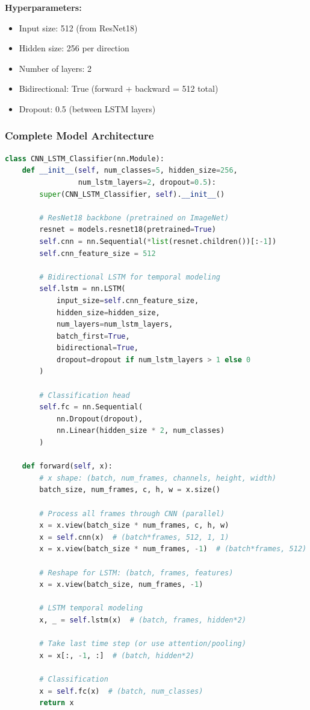 \documentclass[11pt,a4paper]{article}
\begin{document}
\textbf{Hyperparameters:}
\begin{itemize}
\item Input size: 512 (from ResNet18)
\item Hidden size: 256 per direction
\item Number of layers: 2
\item Bidirectional: True (forward + backward = 512 total)
\item Dropout: 0.5 (between LSTM layers)
\end{itemize}

\subsubsection{Complete Model Architecture}

\begin{lstlisting}[language=Python, caption=Full Model Implementation]
class CNN_LSTM_Classifier(nn.Module):
    def __init__(self, num_classes=5, hidden_size=256,
                 num_lstm_layers=2, dropout=0.5):
        super(CNN_LSTM_Classifier, self).__init__()

        # ResNet18 backbone (pretrained on ImageNet)
        resnet = models.resnet18(pretrained=True)
        self.cnn = nn.Sequential(*list(resnet.children())[:-1])
        self.cnn_feature_size = 512

        # Bidirectional LSTM for temporal modeling
        self.lstm = nn.LSTM(
            input_size=self.cnn_feature_size,
            hidden_size=hidden_size,
            num_layers=num_lstm_layers,
            batch_first=True,
            bidirectional=True,
            dropout=dropout if num_lstm_layers > 1 else 0
        )

        # Classification head
        self.fc = nn.Sequential(
            nn.Dropout(dropout),
            nn.Linear(hidden_size * 2, num_classes)
        )

    def forward(self, x):
        # x shape: (batch, num_frames, channels, height, width)
        batch_size, num_frames, c, h, w = x.size()

        # Process all frames through CNN (parallel)
        x = x.view(batch_size * num_frames, c, h, w)
        x = self.cnn(x)  # (batch*frames, 512, 1, 1)
        x = x.view(batch_size * num_frames, -1)  # (batch*frames, 512)

        # Reshape for LSTM: (batch, frames, features)
        x = x.view(batch_size, num_frames, -1)

        # LSTM temporal modeling
        x, _ = self.lstm(x)  # (batch, frames, hidden*2)

        # Take last time step (or use attention/pooling)
        x = x[:, -1, :]  # (batch, hidden*2)

        # Classification
        x = self.fc(x)  # (batch, num_classes)
        return x
\end{lstlisting}
\end{document}
